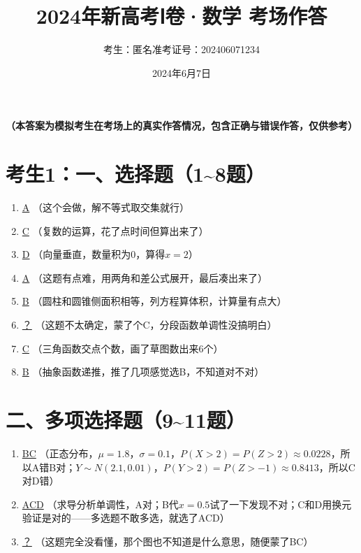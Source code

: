 \documentclass[12pt,a4paper]{article}
\title{2024年新高考Ⅰ卷·数学 考场作答}
\author{考生：匿名\quad 准考证号：202406071234}
\date{2024年6月7日}
\begin{document}
\maketitle

\begin{center}
{\large \textbf{（本答案为模拟考生在考场上的真实作答情况，包含正确与错误作答，仅供参考）}}
\end{center}

\section*{考生1：一、选择题（1\~{}8题）}

\begin{enumerate}[label=\arabic*.]
\item \underline{A} \quad （这个会做，解不等式取交集就行）

\item \underline{C} \quad （复数的运算，花了点时间但算出来了）

\item \underline{D} \quad （向量垂直，数量积为0，算得$x=2$）

\item \underline{A} \quad （这题有点难，用两角和差公式展开，最后凑出来了）

\item \underline{B} \quad （圆柱和圆锥侧面积相等，列方程算体积，计算量有点大）

\item \underline{？} \quad （这题不太确定，蒙了个C，分段函数单调性没搞明白）

\item \underline{C} \quad （三角函数交点个数，画了草图数出来6个）

\item \underline{B} \quad （抽象函数递推，推了几项感觉选B，不知道对不对）
\end{enumerate}

\section*{二、多项选择题（9\~{}11题）}

\begin{enumerate}[label=\arabic*.]
\item \underline{BC} \quad （正态分布，$\mu=1.8$，$\sigma=0.1$，$P(X>2)=P(Z>2)\approx0.0228$，所以A错B对；$Y\sim N(2.1,0.01)$，$P(Y>2)=P(Z>-1)\approx0.8413$，所以C对D错）

\item \underline{ACD} \quad （求导分析单调性，A对；B代$x=0.5$试了一下发现不对；C和D用换元验证是对的——多选题不敢多选，就选了ACD）

\item \underline{？} \quad （这题完全没看懂，那个图也不知道是什么意思，随便蒙了BC）
\end{enumerate}
\end{document}
